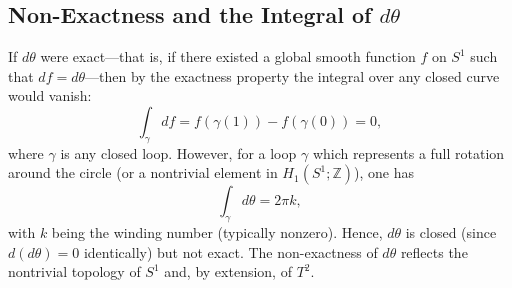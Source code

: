 \documentclass[11pt,openany]{article}
\begin{document}
\subsection{Non-Exactness and the Integral of \(d\theta\)}
If \(d\theta\) were exact—that is, if there existed a global smooth function \(f\) on \(S^1\) such that \(df=d\theta\)—then by the exactness property the integral over any closed curve would vanish:
\[
\int_\gamma df = f(\gamma(1)) - f(\gamma(0)) = 0,
\]
where \(\gamma\) is any closed loop. However, for a loop \(\gamma\) which represents a full rotation around the circle (or a nontrivial element in \(H_1(S^1;\mathbb{Z})\)), one has
\[
\int_\gamma d\theta = 2\pi k,
\]
with \(k\) being the winding number (typically nonzero). Hence, \(d\theta\) is closed (since \(d(d\theta)=0\) identically) but not exact. The non-exactness of \(d\theta\) reflects the nontrivial topology of \(S^1\) and, by extension, of \(T^2\).
%
%
%
%
%
%
%
%
\end{document}
